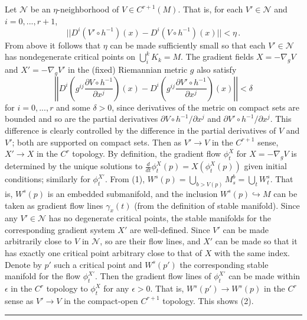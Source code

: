 \documentclass[12pt]{article}
\newcommand{\BlackBox}{\rule{1.5ex}{1.5ex}}  %
\begin{document}
    Let $\mathcal{N}$ be an $\eta$-neighborhood of $V \in C^{r+1}(M)$. That is, for each $V'\in \mathcal{N}$ and $i=0,...,r+1$,    
    \begin{equation*}
        || D^i(V' \circ h^{-1})(x)  - D^i( V \circ h^{-1}) (x)|| < \eta \,.
    \end{equation*}
    From above it follows that $\eta$ can be made sufficiently small so that each $V' \in \mathcal{N}$ has nondegenerate critical points on $\bigcup_i^k K_k= M$. The gradient fields $X = -\nabla_gV$ and $X' = -\nabla_gV'$ in the (fixed) Riemannian metric $g$ also satisfy
    \begin{equation*}
        \left|\left| D^i \left(g^{ij}\frac{\partial V \circ h^{-1}}{\partial x^j}\right)(x)  -D^i \left(g^{ij}\frac{\partial V' \circ h^{-1}}{\partial x^j}\right)(x) \right|\right| < \delta
    \end{equation*}
    for $i=0,...,r$ and some $\delta >0$, since derivatives of the metric on compact sets are bounded and so are the partial derivatives $\partial V \circ h^{-1}/\partial x^j$ and $\partial V' \circ h^{-1}/\partial x^j$. This difference is clearly controlled by the difference in the partial derivatives of $V$ and $V'$; both are supported on compact sets. Then as $V' \rightarrow V$ in the $C^{r+1}$ sense, $X' \rightarrow X$ in the $C^r$ topology. By definition, the gradient flow $\phi_t^X$ for $X = -\nabla_gV$ is determined by the unique solutions to $\frac{d}{dt}\phi^X_t(p) = X(\phi^X_t(p))$ given initial conditions; similarly for $\phi_t^{X'}$. From (1), $W^s(p) = \bigcup_{b>V(p)} M^b_s = \bigcup_{t} W^s_t$. That is, $W^s(p)$ is an embedded submanifold, and the inclusion $W^s(p) \hookrightarrow M$ can be taken as gradient flow lines $\gamma_x(t)$ (from the definition of stable manifold). Since any $V' \in \mathcal{N}$ has no degenerate critical points, the stable manifolds for the corresponding gradient system $X'$ are well-defined. Since $V'$ can be made arbitrarily close to $V$ in $\mathcal{N}$, so are their flow lines, and $X'$ can be made so that it has exactly one critical point arbitrary close to that of $X$ with the same index. Denote by $p'$ such a critical point and $W^s(p')$ the corresponding stable manifold for the flow $\phi_t^{X'}$. Then the gradient flow lines of $\phi_t^{X'}$ can be made within $\epsilon$ in the $C^r$ topology to $\phi_t^{X}$ for any $\epsilon>0$. That is, $W^s(p') \rightarrow W^s(p)$ in the $C^r$ sense as $V' \rightarrow V$ in the compact-open $C^{r+1}$ topology. This shows (2). 
\hfill\BlackBox
\end{document}
